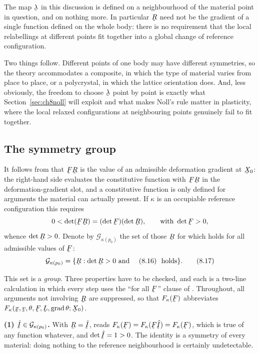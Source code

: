 \begin{remark}\label{rem:ch8localsym}
The map $\vek{\lambda}$ in this discussion is defined on a neighbourhood
of the material point in question, and on nothing more. In particular
$\bR$ need not be the gradient of a single function defined on the whole
body: there is no requirement that the local relabellings at different
points fit together into a global change of reference configuration.

Two things follow. Different points of one body may have different
symmetries, so the theory accommodates a composite, in which the type of
material varies from place to place, or a polycrystal, in which the
lattice orientation does. And, less obviously, the freedom to choose
$\vek{\lambda}$ point by point is exactly what Section~\ref{sec:ch8noll}
will exploit and what makes Noll's rule matter in plasticity, where the
local relaxed configurations at neighbouring points genuinely fail to
fit together.
\end{remark}

\subsection*{The symmetry group}

It follows from  that $\bF\bR$ is the value of an admissible
deformation gradient at $\bX_{0}$: the right-hand side evaluates the
constitutive function with $\bF\bR$ in the deformation-gradient slot,
and a constitutive function is only defined for arguments the material
can actually present. If $\kappa$ is an occupiable reference
configuration this requires
\[
   0<\det(\bF\bR)=(\det\bF)(\det\bR),
   \qquad\text{with }\det\bF>0,
\]
whence $\det\bR>0$. Denote by $\mathcal{G}_{\kappa(p_{0})}$ the set of
those $\bR$ for which  holds for all admissible values of
$\bF$:
\begin{equation}
   \mathcal{G}_{\kappa(p_{0})}
   =\{\bR:\det\bR>0\ \text{and \eqr{8.16} holds}\}.
   \tag{8.17}\label{eq:8.17}
\end{equation}

This set is a \emph{group}. Three properties have to be checked, and
each is a two-line calculation in which every step uses the ``for all
$\bF$'' clause of . Throughout, all arguments not involving
$\bR$ are suppressed, so that $F_{\kappa}(\bF)$ abbreviates
$F_{\kappa}(\bx,\bv,\theta,\bF,\bL,\grad\theta;\bX_{0})$.

\medskip
\noindent
\textbf{(1) $\hI\in\mathcal{G}_{\kappa(p_{0})}$.} With $\bR=\hI$,
 reads $F_{\kappa}(\bF)=F_{\kappa}(\bF\hI)=F_{\kappa}(\bF)$,
which is true of any function whatever, and $\det\hI=1>0$. The identity
is a symmetry of every material: doing nothing to the reference
neighbourhood is certainly undetectable.

